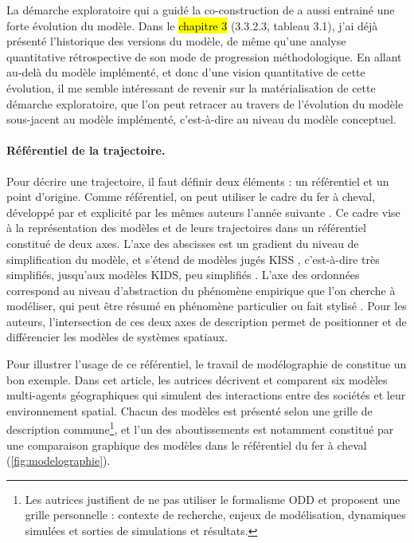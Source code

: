 La démarche exploratoire qui a guidé la co-construction de \simfeodal{} a aussi entrainé une forte évolution du modèle.
Dans le \hl{chapitre 3} (3.3.2.3, tableau 3.1), j'ai déjà présenté l'historique des versions du modèle, de même qu'une analyse quantitative rétrospective de son mode de progression méthodologique.
En allant au-delà du modèle implémenté, et donc d'une vision quantitative de cette évolution, il me semble intéressant de revenir sur la matérialisation de cette démarche exploratoire, que l'on peut retracer au travers de l'évolution du modèle sous-jacent au modèle implémenté, c'est-à-dire au niveau du modèle conceptuel.

\paragraph{Référentiel de la trajectoire.}
Pour décrire une trajectoire, il faut définir deux éléments : un référentiel et un point d'origine.
Comme référentiel, on peut utiliser le cadre du \og fer à cheval\fg{}, développé par \textcite{banos2012vers} et explicité par les mêmes auteurs l'année suivante \autocite{banos2013modeliser}.
Ce cadre vise à la représentation des modèles et de leurs trajectoires dans un référentiel constitué de deux axes.
L'axe des abscisses est un gradient du \og niveau de simplification du modèle\fg{}, et s'étend de modèles jugés \og KISS\fg{} \autocite{}, c'est-à-dire très simplifiés, jusqu'aux modèles \og KIDS\fg{}, peu simplifiés \autocite[840-841]{banos2013modeliser}.
L'axe des ordonnées correspond au \og niveau d'abstraction du phénomène empirique que l'on cherche à modéliser\fg{}, qui peut être résumé en \og phénomène particulier ou fait stylisé\fg{} \autocite[839-840]{banos2013modeliser}.
Pour les auteurs, l'intersection de ces deux axes de description permet de positionner et de différencier les modèles de systèmes spatiaux.

Pour illustrer l'usage de ce référentiel, le travail de \og modélographie\fg{} de \textcite{schmitt_modelographie_2013} constitue un bon exemple.
Dans cet article, les autrices décrivent et comparent six modèles multi-agents géographiques qui simulent des interactions entre des sociétés et leur environnement spatial.
Chacun des modèles est présenté selon une grille de description commune\footnote{
	Les autrices justifient de ne pas utiliser le formalisme ODD \autocite[\S 5-6]{schmitt_modelographie_2013} et proposent une grille personnelle : \og contexte de recherche\fg{}, \og enjeux de modélisation\fg{}, \og dynamiques simulées\fg{} et \og sorties de simulations et résultats\fg{}.
}, et l'un des aboutissements est notamment constitué par une comparaison graphique des modèles dans le référentiel du \og fer à cheval\fg{} (\cref{fig:modelographie}).

